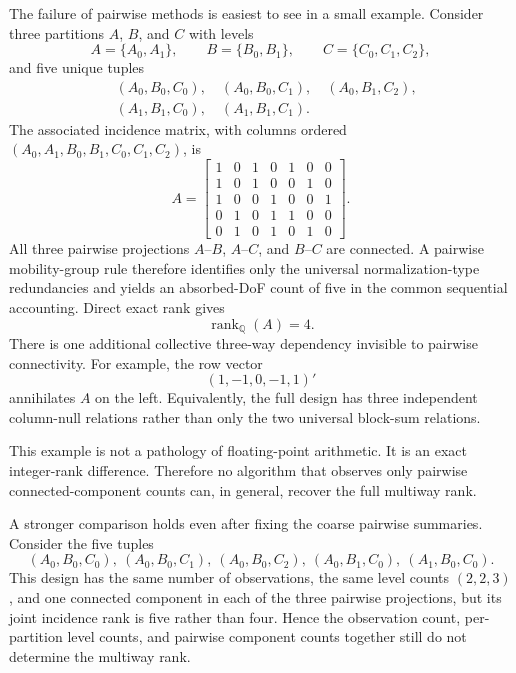 \documentclass[11pt]{article}
\theoremstyle{definition}
\newcommand{\Q}{\mathbb{Q}}
\newcommand{\rank}{\operatorname{rank}}
\newcommand{\1}{\mathbf{1}}
\begin{document}
The failure of pairwise methods is easiest to see in a small example. Consider three partitions $A$, $B$, and $C$ with levels
\begin{equation*}
  A=\{A_0,A_1\},\qquad B=\{B_0,B_1\},\qquad C=\{C_0,C_1,C_2\},
\end{equation*}
and five unique tuples
\begin{align*}
 &(A_0,B_0,C_0),\quad (A_0,B_0,C_1),\quad (A_0,B_1,C_2),\\
 &(A_1,B_1,C_0),\quad (A_1,B_1,C_1).
\end{align*}
The associated incidence matrix, with columns ordered $(A_0,A_1,B_0,B_1,C_0,C_1,C_2)$, is
\begin{equation}
A=\begin{bmatrix}
1&0&1&0&1&0&0\\
1&0&1&0&0&1&0\\
1&0&0&1&0&0&1\\
0&1&0&1&1&0&0\\
0&1&0&1&0&1&0
\end{bmatrix}.
\label{eq:countermatrix}
\end{equation}
All three pairwise projections $A$--$B$, $A$--$C$, and $B$--$C$ are connected. A pairwise mobility-group rule therefore identifies only the universal normalization-type redundancies and yields an absorbed-DoF count of five in the common sequential accounting. Direct exact rank gives
\begin{equation}
  \rank_{\Q}(A)=4.
\end{equation}
There is one additional collective three-way dependency invisible to pairwise connectivity. For example, the row vector
\begin{equation}
  (1,-1,0,-1,1)'
\end{equation}
annihilates $A$ on the left. Equivalently, the full design has three independent column-null relations rather than only the two universal block-sum relations.

This example is not a pathology of floating-point arithmetic. It is an exact integer-rank difference. Therefore no algorithm that observes only pairwise connected-component counts can, in general, recover the full multiway rank.

A stronger comparison holds even after fixing the coarse pairwise summaries. Consider the five tuples
\[
 (A_0,B_0,C_0),\ (A_0,B_0,C_1),\ (A_0,B_0,C_2),\
 (A_0,B_1,C_0),\ (A_1,B_0,C_0).
\]
This design has the same number of observations, the same level counts
$(2,2,3)$, and one connected component in each of the three pairwise
projections, but its joint incidence rank is five rather than four. Hence the
observation count, per-partition level counts, and pairwise component counts
together still do not determine the multiway rank.
\end{document}
